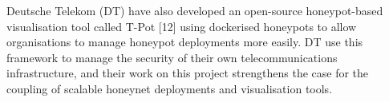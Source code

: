 Deutsche Telekom (DT) have also developed an open-source honeypot-based visualisation tool called T-Pot [12] using dockerised honeypots to allow organisations to manage honeypot deployments more easily. DT use this framework to manage the security of their own telecommunications infrastructure, and their work on this project strengthens the case for the coupling of scalable honeynet deployments and visualisation tools.  

